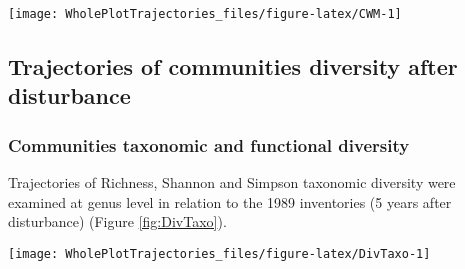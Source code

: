 \documentclass[fleqn,10pt]{ArtEcoFoG} %
\theoremstyle{definition}
\theoremstyle{definition}
\theoremstyle{definition}
\theoremstyle{remark}
\begin{document}
\begin{figure*}

{\centering \texttt{[image: WholePlotTrajectories\_files/figure-latex/CWM-1]} 

}

\caption{Trajectories of the communities weighted means (CWM) over 30 years after disturbance of 4 leaf traits (Leaf thickness, \emph{L\_thickness}, chlorophyll content, \emph{L\_chloro}, toughness, \emph{L\_toughness} and specific area, \emph{SLA}), 2 stem traits (wood specific gravity, \emph{WD}, and bark thickness, \emph{Bark-thick}) and one life trait (Specific maximum height at adult stage, \emph{Hmax}). Trajectories correspond to the median (solid line) and 0.025 and 0.975 percentile (gray envelope) observed after 50 iteration of the taxonomic uncertainty propagation and the missing trait value filling processes. Initial treatments are represented by solid lines colors with green for control, blue for T1,orange for T2 and red for T3.}\label{fig:CWM}
\end{figure*}

\subsection{Trajectories of communities diversity after
disturbance}\label{trajectories-of-communities-diversity-after-disturbance}

\subsubsection{Communities taxonomic and functional
diversity}\label{communities-taxonomic-and-functional-diversity}

Trajectories of Richness, Shannon and Simpson taxonomic diversity were
examined at genus level in relation to the 1989 inventories (5 years
after disturbance) (Figure \ref{fig:DivTaxo}).

\begin{figure*}

{\centering \texttt{[image: WholePlotTrajectories\_files/figure-latex/DivTaxo-1]} 

}

\caption{Trajectories of the difference to the 1989 inventories (5 years after disturbance) over 30 years after disturbance of plots communities \textbf{(a)} Richness, \textbf{(b)} Shannon and \textbf{(c)} Simpson diversities. Trajectories correspond to the median (solid line) and 0.025 and 0.975 percentile (gray envelope) observed after 50 iteration of the taxonomic uncertainty propagation. Initial treatments are represented by solid lines colors with green for control, blue for T1,orange for T2 and red for T3.}\label{fig:DivTaxo}
\end{figure*}
\end{document}
